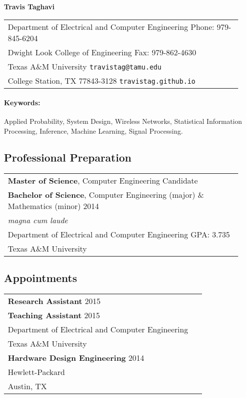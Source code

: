 \documentclass[11pt]{article}
\begin{document}
\begin{center}
{\bfseries \Large Travis Taghavi}
\end{center}

\begin{center}
\begin{tabular}{p{0.95\linewidth}}
Department of Electrical and Computer Engineering
\hfill Phone: 979-845-6204 \\
Dwight Look College of Engineering
\hfill Fax: 979-862-4630 \\
Texas A\&M University
\hfill \texttt{travistag@tamu.edu} \\
College Station, TX 77843-3128
\hfill \texttt{travistag.github.io}
\end{tabular}
\end{center}

\paragraph{Keywords:} Applied Probability, System Design, Wireless Networks, Statistical Information Processing, Inference, Machine Learning, Signal Processing.

\subsection*{Professional Preparation}

\begin{center}
\begin{tabular}{p{0.95\linewidth}}
\textbf{Master of Science}, Computer Engineering \hfill Candidate \\
\textbf{Bachelor of Science}, Computer Engineering (major) \& Mathematics (minor) \hfill 2014 \\
{\em magna cum laude}\\
Department of Electrical and Computer Engineering \hfill GPA: 3.735\\
Texas A\&M University
\end{tabular}
\end{center}

\subsection*{Appointments}

\begin{center}
\begin{tabular}{p{0.95\linewidth}}
\textbf{Research Assistant} \hfill 2015 \\
\textbf{Teaching Assistant} \hfill 2015\\
Department of Electrical and Computer Engineering \\
Texas A\&M University \\[4pt]
\textbf{Hardware Design Engineering} \hfill 2014 \\
Hewlett-Packard \\
Austin, TX
\end{tabular}
\end{center}
\end{document}
